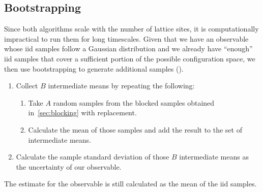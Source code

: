 	\subsection{Bootstrapping}\label{sec:bootstrap}
		Since both algorithms scale with the number of lattice sites, it is computationally impractical to run them for long timescales. Given that we have an observable whose iid samples follow a Gaussian distribution and we already have \enquote{enough} iid samples that cover a sufficient portion of the possible configuration space, we then use bootstrapping to generate additional samples (\citet{bootstrap}).
		\begin{enumerate}
			\item Collect $B$ intermediate means by repeating the following:
			\begin{enumerate}
				\item Take $A$ random samples from the blocked samples obtained in~\cref{sec:blocking} with replacement.
				\item Calculate the mean of those samples and add the result to the set of intermediate means.
			\end{enumerate}
			\item Calculate the sample standard deviation of those $B$ intermediate means as the uncertainty of our observable.
		\end{enumerate}
		The estimate for the observable is still calculated as the mean of the iid samples.